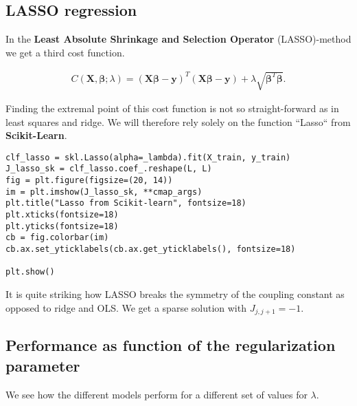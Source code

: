 \documentclass[%
oneside,                 %
final,                   %
10pt]{article}
\begin{document}
\subsection*{LASSO regression}

In the \textbf{Least Absolute Shrinkage and Selection Operator} (LASSO)-method we get a third cost function.

\begin{align}
    C(\bm{X}, \bm{\beta}; \lambda) = (\bm{X}\bm{\beta} - \bm{y})^T(\bm{X}\bm{\beta} - \bm{y}) + \lambda \sqrt{\bm{\beta}^T\bm{\beta}}.
\end{align}

Finding the extremal point of this cost function is not so straight-forward as in least squares and ridge. We will therefore rely solely on the function ``Lasso`` from \textbf{Scikit-Learn}.

\begin{verbatim}
clf_lasso = skl.Lasso(alpha=_lambda).fit(X_train, y_train)
J_lasso_sk = clf_lasso.coef_.reshape(L, L)
fig = plt.figure(figsize=(20, 14))
im = plt.imshow(J_lasso_sk, **cmap_args)
plt.title("Lasso from Scikit-learn", fontsize=18)
plt.xticks(fontsize=18)
plt.yticks(fontsize=18)
cb = fig.colorbar(im)
cb.ax.set_yticklabels(cb.ax.get_yticklabels(), fontsize=18)

plt.show()
\end{verbatim}

It is quite striking how LASSO breaks the symmetry of the coupling
constant as opposed to ridge and OLS. We get a sparse solution with
$J_{j, j + 1} = -1$.



\subsection*{Performance as  function of the regularization parameter}

We see how the different models perform for a different set of values for $\lambda$.
\end{document}
